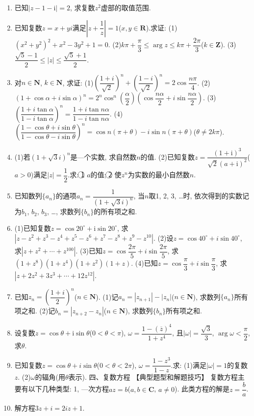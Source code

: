 \documentclass[10pt,a4paper]{article}
\begin{document}
\begin{enumerate}[1.]
\item 已知$|z-1-\mathrm{i}|=2$, 求复数$z^2$虚部的取值范围.
\item 已知复数$z=x+yi$满足$|z+\dfrac 1z|=1$($x,y\in \mathbf{R}$).求证:
(1)$(x^2+y^2)^2+x^2-3y^2+1=0$.
(2)$k\pi +\dfrac{\pi }3\le \arg z\le k\pi +\dfrac{2\pi }3$($k\in \mathbf{Z}$).
(3)$\dfrac{\sqrt 5-1}2\le|z|\le \dfrac{\sqrt 5+1}2$.
\item 对$n\in \mathbf{N}$, $k\in \mathbf{N}$, 求证:
(1)$(\dfrac{1+i}{\sqrt 2})^n+(\dfrac{1-i}{\sqrt 2})^n=2\cos \dfrac{n\pi }4$.
(2)$(1+\cos \alpha +i\sin \alpha)^n=2^n\cos ^n(\dfrac{\alpha }2)(\cos \dfrac{n\alpha }2+i\sin \dfrac{n\alpha }2)$.
(3)$(\dfrac{1+i\tan \alpha }{1-i\tan \alpha })^n=\dfrac{1+i\tan n\alpha }{1-i\tan n\alpha }$.
(4)$(\dfrac{1-\cos \theta +i\sin \theta }{1-\cos \theta -i\sin \theta })^n=\cos n(\pi +\theta)-i\sin n(\pi +\theta)$($\theta \ne 2k\pi$).
\item (1)若$(1+\sqrt 3i)^n$是—个实数, 求自然数$n$的值.
(2)已知复数$z=\dfrac{{{(1+\mathrm{i})}^3}}{\sqrt 2{{(a+\mathrm{i})}^2}}$($a>0$)满足$|z|=\dfrac 12$.求:
\textcircled{1} $a$的值; 								\textcircled{2} 使$z^n$为实数的最小自然数$n$.
\item 已知数列$\{a_n\}$的通项$a_n=\dfrac 1{(1+\sqrt 3i)^n}$, 当$n$取1, 2, 3, …时, 依次得到的实数记为$b_1$, $b_2$, $b_3$, …, 求数列$\{b_n\}$的所有项之和.
\item (1)已知复数$z=\cos 20^\circ +\mathrm{i}\sin 20^\circ$, 求$|z-z^2+z^3-z^4+z^5-z^6+z^7-z^8+z^9-z^{10}|$.
(2)设$z=\cos 40^\circ +i\sin 40^\circ$, 求$|z+z^2+\cdots +z^{100}|$.
(3)已知$z=\cos \dfrac{2\pi }5+i\sin \dfrac{2\pi }5$, 求$(1+z^8)(1+z^4)(1+z^2)(1+z)$.
(4)已知$z=\cos \dfrac{\pi }3+i\sin \dfrac{\pi }3$, 求$|z+2z^2+3z^3+\cdots +12z^{12}|$.
\item 已知$z_n=(\dfrac{1+i}2)^n$($n\in \mathbf{N}$).
(1)记$a_n=|z_{n+1}|-|z_n|$($n\in \mathbf{N}$), 求数列$\{a_n\}$所有项之和.
(2)记$b_n=|z_{n+2}-z_n|$($n\in \mathbf{N}$), 求数列$\{b_n\}$所有项之和.
\item 设复数$z=\cos \theta +\mathrm{i}\sin \theta$($0<\theta <\pi$), $\omega =\dfrac{1-{{({\overline z})}^4}}{1+{z^4}}$, 且$|\omega|=\dfrac{\sqrt 3}3$, $\arg \omega <\dfrac{\pi }2$, 求$\theta$.
\item 已知复数$z=\cos \theta +i\sin \theta$($0<\theta <2\pi$), $\omega =\dfrac{1-{z^3}}{1-z}$.求:
(1)满足$|\omega|=1$的复数$z$.
(2)$\omega$的辐角(用$\theta$表示).
四、复数方程
【典型题型和解题技巧】
复数方程主要有以下几种类型:
1, —次方程$az=b$($a,b\in \mathbf{C}$, $a\ne 0$).
此类方程的解是$z=\dfrac ba$.
\item 解方程$3z+i=2iz+1$.

\end{enumerate}
\end{document}
